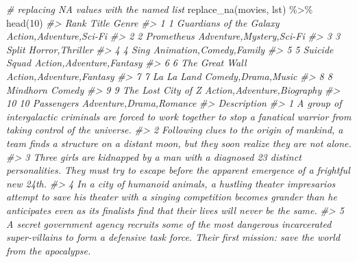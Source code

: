 \documentclass[
]{book}
\newenvironment{Shaded}{\begin{snugshade}}{\end{snugshade}}
\newcommand{\CommentTok}[1]{\textcolor[rgb]{0.56,0.35,0.01}{\textit{#1}}}
\newcommand{\DecValTok}[1]{\textcolor[rgb]{0.00,0.00,0.81}{#1}}
\newcommand{\FunctionTok}[1]{\textcolor[rgb]{0.00,0.00,0.00}{#1}}
\newcommand{\NormalTok}[1]{#1}
\newcommand{\SpecialCharTok}[1]{\textcolor[rgb]{0.00,0.00,0.00}{#1}}
\begin{document}
\begin{Shaded}
\begin{Highlighting}[]
\CommentTok{\# replacing NA values with the named list}
\FunctionTok{replace\_na}\NormalTok{(movies, lst) }\SpecialCharTok{\%\textgreater{}\%}
\FunctionTok{head}\NormalTok{(}\DecValTok{10}\NormalTok{)}
\CommentTok{\#\textgreater{}    Rank                   Title                      Genre}
\CommentTok{\#\textgreater{} 1     1 Guardians of the Galaxy    Action,Adventure,Sci{-}Fi}
\CommentTok{\#\textgreater{} 2     2              Prometheus   Adventure,Mystery,Sci{-}Fi}
\CommentTok{\#\textgreater{} 3     3                   Split            Horror,Thriller}
\CommentTok{\#\textgreater{} 4     4                    Sing    Animation,Comedy,Family}
\CommentTok{\#\textgreater{} 5     5           Suicide Squad   Action,Adventure,Fantasy}
\CommentTok{\#\textgreater{} 6     6          The Great Wall   Action,Adventure,Fantasy}
\CommentTok{\#\textgreater{} 7     7              La La Land         Comedy,Drama,Music}
\CommentTok{\#\textgreater{} 8     8                Mindhorn                     Comedy}
\CommentTok{\#\textgreater{} 9     9      The Lost City of Z Action,Adventure,Biography}
\CommentTok{\#\textgreater{} 10   10              Passengers    Adventure,Drama,Romance}
\CommentTok{\#\textgreater{}                                                                                                                                                                                                                                        Description}
\CommentTok{\#\textgreater{} 1                                                                                                                  A group of intergalactic criminals are forced to work together to stop a fanatical warrior from taking control of the universe.}
\CommentTok{\#\textgreater{} 2                                                                                                                  Following clues to the origin of mankind, a team finds a structure on a distant moon, but they soon realize they are not alone.}
\CommentTok{\#\textgreater{} 3                                                                                    Three girls are kidnapped by a man with a diagnosed 23 distinct personalities. They must try to escape before the apparent emergence of a frightful new 24th.}
\CommentTok{\#\textgreater{} 4                   In a city of humanoid animals, a hustling theater impresario\textquotesingle{}s attempt to save his theater with a singing competition becomes grander than he anticipates even as its finalists\textquotesingle{} find that their lives will never be the same.}
\CommentTok{\#\textgreater{} 5                                                              A secret government agency recruits some of the most dangerous incarcerated super{-}villains to form a defensive task force. Their first mission: save the world from the apocalypse.}

\end{Highlighting}
\end{Shaded}
\end{document}
